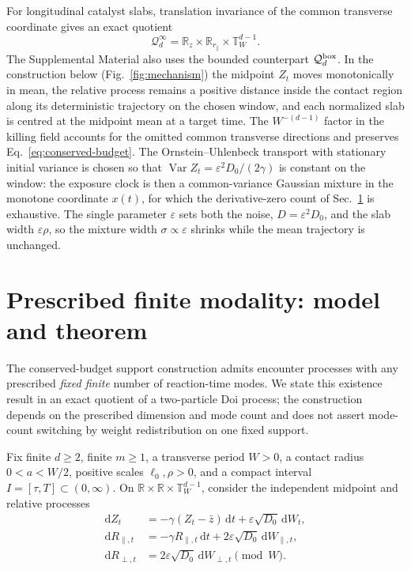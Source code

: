 \documentclass[aps,physrev,reprint,amsmath,amssymb,longbibliography,floatfix]{revtex4-2}
\newcommand{\dd}{\mathrm d}
\begin{document}
For longitudinal catalyst slabs, translation invariance of the common
transverse coordinate gives an exact quotient
\begin{equation}
 \mathcal Q_d^{\infty}
 =\mathbb R_z\times\mathbb R_{r_\parallel}\times
   \mathbb T_W^{d-1}.
 \label{eq:quotient}
\end{equation}
The Supplemental Material also uses the bounded counterpart
\(\mathcal Q_d^{\rm box}\).  In the construction below
(Fig.~\ref{fig:mechanism}) the midpoint \(Z_t\) moves monotonically in mean,
the relative process remains a positive distance inside the contact region
along its deterministic trajectory on the chosen window, and each normalized
slab is centred at the midpoint mean at a target time.  The
\(W^{-(d-1)}\) factor in the killing field accounts for the omitted common
transverse directions and preserves Eq.~\eqref{eq:conserved-budget}.
The Ornstein--Uhlenbeck transport with stationary initial variance is chosen
so that \(\operatorname{Var}Z_t=\varepsilon^2D_0/(2\gamma)\) is constant on
the window: the exposure clock is then a common-variance Gaussian mixture in
the monotone coordinate \(x(t)\), for which the derivative-zero count of
Sec.~\ref{sec:exact-m-spine} is exhaustive.  The single parameter
\(\varepsilon\) sets both the noise, \(D=\varepsilon^2D_0\), and the slab
width \(\varepsilon\rho\), so the mixture width \(\sigma\propto\varepsilon\)
shrinks while the mean trajectory is unchanged.

\section{Prescribed finite modality: model and theorem}
\label{sec:exact-m-spine}

The conserved-budget support construction admits encounter processes with any
prescribed \emph{fixed finite} number of reaction-time modes.  We state this
existence result in an exact quotient of a two-particle Doi process; the
construction depends on the prescribed dimension and mode count and does not
assert mode-count switching by weight redistribution on one fixed support.

Fix finite $d\ge2$, finite $m\ge1$, a transverse period $W>0$, a contact
radius $0<a<W/2$, positive scales $\ell_0,\rho>0$, and a compact interval
$I=[\tau,T]\subset(0,\infty)$.
On $\mathbb R\times\mathbb R\times\mathbb T_W^{d-1}$, consider the
independent midpoint and relative processes
\begin{equation}
 \begin{aligned}
 \dd Z_t&=-\gamma(Z_t-\bar z)\,\dd t
       +\varepsilon\sqrt{D_0}\,\dd W_t,\\
 \dd R_{\parallel,t}&=-\gamma R_{\parallel,t}\,\dd t
       +2\varepsilon\sqrt{D_0}\,\dd W_{\parallel,t},\\
 \dd R_{\perp,t}&=2\varepsilon\sqrt{D_0}\,\dd W_{\perp,t}\pmod W.
 \end{aligned}
 \label{eq:exact-m-process}
\end{equation}
\end{document}
